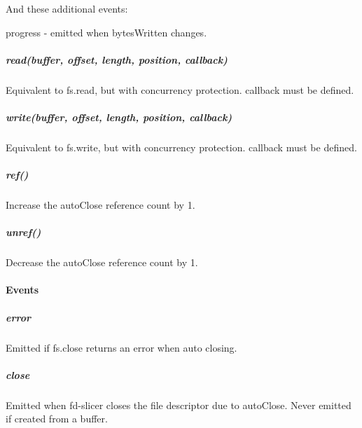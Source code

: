 And these additional events\+:


\begin{DoxyItemize}
\item \textquotesingle{}progress\textquotesingle{} -\/ emitted when {\ttfamily bytes\+Written} changes.
\end{DoxyItemize}

\subparagraph*{read(buffer, offset, length, position, callback)}

Equivalent to {\ttfamily fs.\+read}, but with concurrency protection. {\ttfamily callback} must be defined.

\subparagraph*{write(buffer, offset, length, position, callback)}

Equivalent to {\ttfamily fs.\+write}, but with concurrency protection. {\ttfamily callback} must be defined.

\subparagraph*{ref()}

Increase the {\ttfamily auto\+Close} reference count by 1.

\subparagraph*{unref()}

Decrease the {\ttfamily auto\+Close} reference count by 1.

\paragraph*{Events}

\subparagraph*{\textquotesingle{}error\textquotesingle{}}

Emitted if {\ttfamily fs.\+close} returns an error when auto closing.

\subparagraph*{\textquotesingle{}close\textquotesingle{}}

Emitted when fd-\/slicer closes the file descriptor due to {\ttfamily auto\+Close}. Never emitted if created from a buffer. 